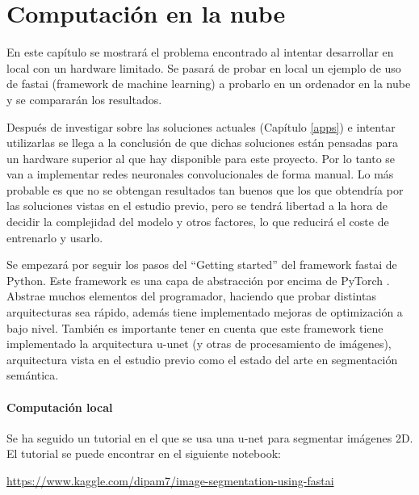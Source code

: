 \chapter{Computación en la nube}\label{cloudcomputing}

En este capítulo se mostrará el problema encontrado al intentar desarrollar en local con un hardware limitado. Se pasará de probar en local un ejemplo de uso de fastai (framework de machine learning) a probarlo en un ordenador en la nube y se compararán los resultados.

Después de investigar sobre las soluciones actuales (Capítulo \ref{apps}) e intentar utilizarlas se llega a la conclusión de que dichas soluciones están pensadas para un hardware superior al que hay disponible para este proyecto. Por lo tanto se van a implementar redes neuronales convolucionales de forma manual. Lo más probable es que no se obtengan resultados tan buenos que los que obtendría por las soluciones vistas en el estudio previo, pero se tendrá libertad a la hora de decidir la complejidad del modelo y otros factores, lo que reducirá el coste de entrenarlo y usarlo.

Se empezará por seguir los pasos del “Getting started” del framework fastai \cite{Howard2018} de Python. Este framework es una capa de abstracción por encima de PyTorch \cite{Paszke2019}. Abstrae muchos elementos del programador, haciendo que probar distintas arquitecturas sea rápido, además tiene implementado mejoras de optimización a bajo nivel. También es importante tener en cuenta que este framework tiene implementado la arquitectura u-unet (y otras de procesamiento de imágenes), arquitectura vista en el estudio previo como el estado del arte en segmentación semántica.

\subsubsection{Computación local}\label{sec:local_dev}

Se ha seguido un tutorial en el que se usa una u-net para segmentar imágenes 2D. El tutorial se puede encontrar en el siguiente notebook:

\url{https://www.kaggle.com/dipam7/image-segmentation-using-fastai}

